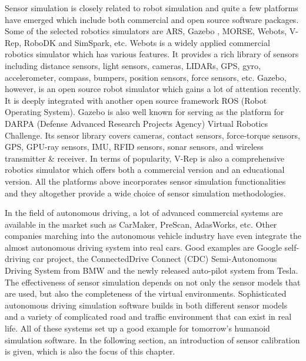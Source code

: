 \documentclass[twocolumn,10pt]{asme2ej}
\begin{document}
{\color{blue} Sensor simulation is closely related to robot simulation and quite a few platforms have emerged which include both commercial and open source software packages. Some of the selected robotics simulators are ARS\cite{ars}, Gazebo \cite{Koenig-2004-394,Aguero-2015-VRC}, MORSE\cite{morse_simpar_2012}, Webots\cite{Webots,Webots04}, V-Rep\cite{vrep}, RoboDK\cite{RoboDK} and SimSpark\cite{simspark}, etc. Webots is a widely applied commercial robotics simulator which has various features. It provides a rich library of sensors including distance sensors, light sensors, cameras, LIDARs, GPS, gyro, accelerometer, compass, bumpers, position sensors, force sensors, etc. 
Gazebo, however, is an open source robot simulator which gains a lot of attention recently. It is deeply integrated with another open source framework ROS (Robot Operating System). Gazebo is also well known for serving as the platform for DARPA (Defense Advanced Research Projects Agency) Virtual Robotics Challenge. Its sensor library covers cameras, contact sensors, force-torque sensors, GPS, GPU-ray sensors, IMU, RFID sensors, sonar sensors, and wireless transmitter \& receiver. 
In terms of popularity, V-Rep is also a comprehensive robotics simulator which offers both a commercial version and an educational version. All the platforms above incorporates sensor simulation functionalities and they altogether provide a wide choice of sensor simulation methodologies.

In the field of autonomous driving, a lot of advanced commercial systems are available in the market such as CarMaker\cite{carmaker}, PreScan\cite{prescan}, AdasWorks\cite{adasworks}, etc. Other companies marching into the autonomous vehicle industry have even integrate the almost autonomous driving system into real cars. Good examples are Google self-driving car project\cite{googlecar}, the
ConnectedDrive Connect (CDC) Semi-Autonomous Driving System from BMW\cite{BMW} and the newly released auto-pilot system from Tesla\cite{autopilot}. The effectiveness of sensor simulation depends on not only the sensor models that are used, but also the completeness of the virtual environments. Sophisticated autonomous driving simulation software builds in both different sensor models and a variety of complicated road and traffic environment that can exist in real life. All of these systems set up a good example for tomorrow's humanoid simulation software. In the following section, an introduction of sensor calibration is given, which is also the focus of this chapter. 
}
\end{document}
